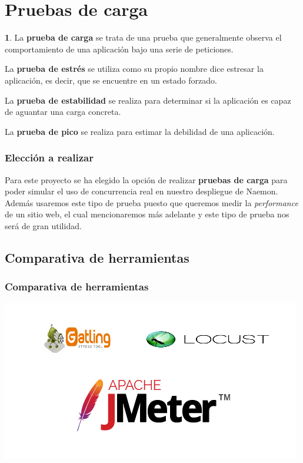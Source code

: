 \documentclass{beamer}
\theoremstyle{plain}
\theoremstyle{definition}
\newtheorem{defn}[thm]{}
\theoremstyle{plain}
\theoremstyle{definition}
\theoremstyle{remark}
\theoremstyle{definition}
\begin{document}
\section{Pruebas de carga} 
\begin{frame}
	\begin{defn}
	La \textbf{prueba de carga} se trata de una prueba que generalmente observa el comportamiento de una aplicación bajo una serie de peticiones.

	La \textbf{prueba de estrés} se utiliza como su propio nombre dice estresar la aplicación, es decir, que se encuentre en un estado forzado.

	La \textbf{prueba de estabilidad} se realiza para determinar si la aplicación es capaz de aguantar una carga concreta.

	La \textbf{prueba de pico} se realiza para estimar la debilidad de una aplicación.
\end{defn}
\end{frame}

\begin{frame}
	\frametitle{Elección a realizar}
	Para este proyecto se ha elegido la opción de realizar \textbf{pruebas de 	carga} para poder simular el uso de concurrencia real en nuestro despliegue de Naemon.
	Además usaremos este tipo de prueba puesto que queremos medir
	la \textit{performance} de un sitio web, el cual mencionaremos más adelante y 	este tipo de prueba nos será de gran utilidad.
\end{frame}

\subsection{Comparativa de herramientas}
\begin{frame}
	\frametitle{Comparativa de herramientas}
	\centering
	\includegraphics[scale=0.8]{imagenes/comparativaHerramientasPrueba.png}
	
\end{frame}
\end{document}
